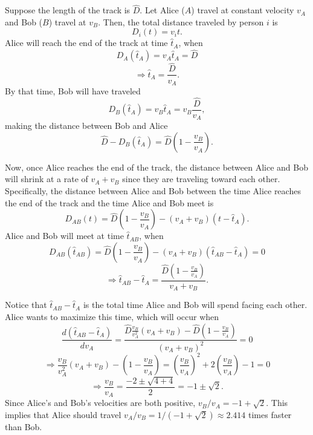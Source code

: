 \documentclass{article}
\begin{document}
Suppose the length of the track is $\hat{D}$. Let Alice ($A$) travel at constant velocity $v_A$ and Bob ($B$) travel at $v_B$. Then, the total distance traveled by person $i$ is
$$D_i(t) = v_i t.$$
Alice will reach the end of the track at time $\hat{t}_A$, when
$$D_A\left(\hat{t}_A\right) = v_A \hat{t}_A = \hat{D}$$ $$\Rightarrow \hat{t}_A = \frac{\hat{D}}{v_A}.$$
By that time, Bob will have traveled
$$D_B\left(\hat{t}_A\right) = v_B\hat{t}_A = v_B\frac{\hat{D}}{v_A},$$
making the distance between Bob and Alice
$$\hat{D} - D_B(\hat{t}_A) = \hat{D}\left(1 - \frac{v_B}{v_A}\right).$$

Now, once Alice reaches the end of the track, the distance between Alice and Bob will shrink at a rate of $v_A + v_B$ since they are traveling toward each other. Specifically, the distance between Alice and Bob between the time Alice reaches the end of the track and the time Alice and Bob meet is
$$D_{AB}(t) = \hat{D}\left(1 - \frac{v_B}{v_A}\right) - (v_A + v_B)\left(t - \hat{t}_A\right).$$
Alice and Bob will meet at time $\hat{t}_{AB}$, when
$$D_{AB}\left(\hat{t}_{AB}\right) = \hat{D}\left(1 - \frac{v_B}{v_A}\right) - (v_A + v_B)\left(\hat{t}_{AB} - \hat{t}_A\right) = 0$$
$$\Rightarrow \hat{t}_{AB} - \hat{t}_A = \frac{\hat{D}\left(1 - \frac{v_B}{v_A}\right)}{v_A + v_B}.$$

Notice that $\hat{t}_{AB} - \hat{t}_A$ is the total time Alice and Bob will spend facing each other. Alice wants to maximize this time, which will occur when
$$\frac{d\left(\hat{t}_{AB} - \hat{t}_A\right)}{dv_A} = \frac{\hat{D}\frac{v_B}{v_A^2}(v_A + v_B) - \hat{D}\left(1 - \frac{v_B}{v_A}\right)}{(v_A + v_B)^2} = 0$$
$$\Rightarrow \frac{v_B}{v_A^2}(v_A + v_B) - \left(1 - \frac{v_B}{v_A}\right) = \left(\frac{v_B}{v_A}\right)^2 + 2\left(\frac{v_B}{v_A}\right) - 1 = 0$$
$$\Rightarrow \frac{v_B}{v_A} = \frac{-2 \pm \sqrt{4 + 4}}{2} = -1 \pm \sqrt{2}.$$
Since Alice's and Bob's velocities are both positive, $v_B/v_A = -1 + \sqrt{2}$. This implies that Alice should travel $v_A/v_B = 1 / (-1 + \sqrt{2}) \approx 2.414$ times faster than Bob.
\end{document}
